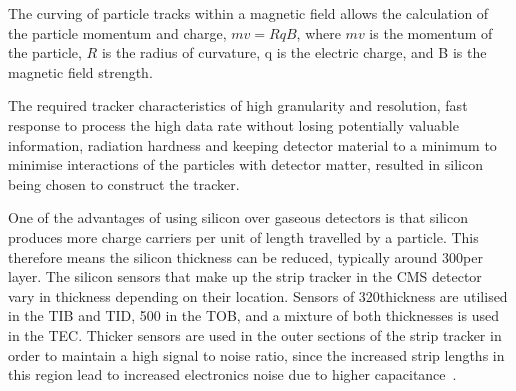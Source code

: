The curving of particle tracks within a magnetic field allows the calculation of the particle momentum and
charge, $mv=RqB$, where $mv$ is the momentum of the particle, $R$ is the radius of curvature, q is the
electric charge, and B is the magnetic field strength.




The required tracker characteristics of high granularity and resolution, fast response to process the high
data rate without losing potentially valuable information, radiation hardness and keeping detector material to
a minimum to minimise interactions of the particles with detector matter, resulted in silicon being chosen to
construct the tracker.

One of the advantages of using silicon over gaseous detectors is that silicon produces more charge carriers
per unit of length travelled by a particle. This therefore means the silicon thickness can be reduced,
typically around 300\um per layer. The silicon sensors that make up the strip tracker in the CMS detector vary
in thickness depending on their location. Sensors of 320\um thickness are utilised in the TIB and TID, 500\um
in the TOB, and a mixture of both thicknesses is used in the TEC. Thicker sensors are used in the outer
sections of the strip tracker in order to maintain a high signal to noise ratio, since the increased strip
lengths in this region lead to increased electronics noise due to higher capacitance~\cite{CMS_experiment}.

